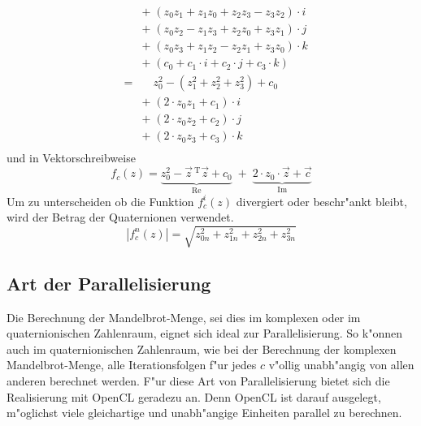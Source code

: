 \begin{refsection}
\begin{equation}
\begin{array}{lcl}
		&& +\; (z_0 z_1 + z_1 z_0 + z_2 z_3 - z_3 z_2)\cdot i\\
		&& +\; (z_0 z_2 - z_1 z_3 + z_2 z_0 + z_3 z_1)\cdot j\\
		&& +\; (z_0 z_3 + z_1 z_2 - z_2 z_1 + z_3 z_0)\cdot k\\
		&& +\; (c_0 + c_1\cdot i + c_2\cdot j + c_3\cdot k)\\[0.3cm]
		& = & \;\;\;\, z_0^2 - (z_1^2 + z_2^2 + z_3^2) + c_0\\
		&& +\; (2\cdot z_0 z_1 + c_1)\cdot i\\
		&& +\; (2\cdot z_0 z_2 + c_2)\cdot j\\
		&& +\; (2\cdot z_0 z_3 + c_3)\cdot k\\
	\end{array}
	\label{equ. quaternionItFormel}
\end{equation}
und in Vektorschreibweise
\begin{equation}
	f_c(z) = \underbrace{z_0^2 - \vec z\,^{\mathrm T}\vec z  + c_0}_{\operatorname{Re}} \;+\; \underbrace{2\cdot z_0 \cdot \vec z + \vec c}_{\operatorname{Im}}
	\label{equ. quaternionItFormelVec}
\end{equation}		
Um zu unterscheiden ob die Funktion $f_c^i(z)$ divergiert oder beschr"ankt bleibt, wird der Betrag der Quaternionen verwendet.
\begin{equation}
	|f_c^n(z)| = \sqrt{z_{0n}^2+z_{1n}^2+z_{2n}^2+z_{3n}^2}
	\label{equ. quaternionBetrag}
\end{equation}

\subsection{Art der Parallelisierung}
Die Berechnung der Mandelbrot-Menge, sei dies im komplexen oder im
quaternionischen Zahlenraum, eignet sich ideal zur Parallelisierung. So
k"onnen auch im quaternionischen Zahlenraum, wie bei der Berechnung
der komplexen Mandelbrot-Menge, alle Iterationsfolgen f"ur jedes $c$
v"ollig unabh"angig von allen anderen berechnet werden. F"ur diese Art
von Parallelisierung bietet sich die Realisierung mit OpenCL geradezu
an. Denn OpenCL ist darauf ausgelegt, m"oglichst viele gleichartige und
unabh"angige Einheiten parallel zu berechnen.


\end{refsection}
